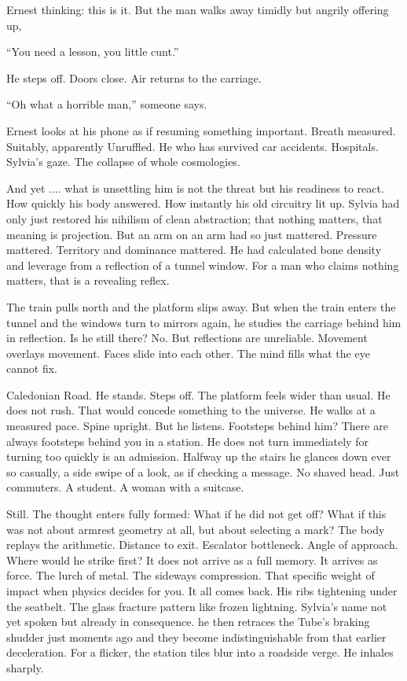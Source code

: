 Ernest thinking: this is it. But the man walks away timidly but angrily offering up,

“You need a lesson, you little cunt.”

He steps off. Doors close. Air returns to the carriage.

“Oh what a horrible man,” someone says.

Ernest looks at his phone as if resuming something important. Breath measured. Suitably, apparently Unruffled. He who has survived car accidents. Hospitals. Sylvia’s gaze. The collapse of whole cosmologies.

And yet .... what is unsettling him is not the threat but his readiness to react. How quickly his body answered. How instantly his old circuitry lit up. Sylvia had only just restored his nihilism of clean abstraction; that nothing matters, that meaning is projection. But an arm on an arm had so just mattered. Pressure mattered. Territory and dominance mattered. He had calculated bone density and leverage from a reflection of a tunnel window. For a man who claims nothing matters, that is a revealing reflex.

The train pulls north and the platform slips away. But when the train enters the tunnel and the windows turn to mirrors again, he studies the carriage behind him in reflection.
Is he still there? No. But reflections are unreliable. Movement overlays movement. Faces slide into each other. The mind fills what the eye cannot fix.

Caledonian Road. He stands. Steps off. The platform feels wider than usual. He does not rush. That would concede something to the universe. He walks at a measured pace. Spine upright. But he listens. Footsteps behind him? There are always footsteps behind you in a station. He does not turn immediately for turning too quickly is an admission.
Halfway up the stairs he glances down ever so casually, a side swipe of a look, as if checking a message. No shaved head. Just commuters. A student. A woman with a suitcase.

Still. The thought enters fully formed: What if he did not get off? What if this was not about armrest geometry at all, but about selecting a mark? The body replays the arithmetic. Distance to exit. Escalator bottleneck. Angle of approach. Where would he strike first? It does not arrive as a full memory. It arrives as force. The lurch of metal. The sideways compression. That specific weight of impact when physics decides for you. It all comes back. His ribs tightening under the seatbelt. The glass fracture pattern like frozen lightning. Sylvia’s name not yet spoken but already in consequence. he then retraces the Tube’s braking shudder just moments ago and they become indistinguishable from that earlier deceleration. For a flicker, the station tiles blur into a roadside verge. He inhales sharply.

